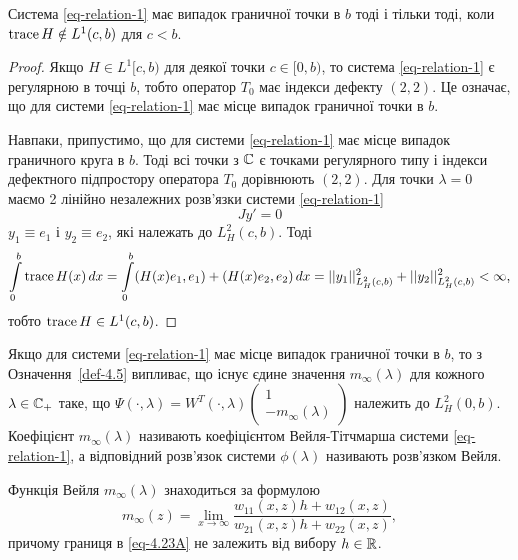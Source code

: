 \begin{theorem}
	Система \eqref{eq-relation-1} має випадок граничної точки в $b$ тоді і тільки тоді, коли $\operatorname{trace} H \notin L^1(c,b)$ для $c<b$.
\end{theorem}
\begin{proof}
	Якщо $H\in L^1[c,b)$ для деякої точки $c\in [0,b)$, то система \eqref{eq-relation-1} є регулярною в точці $b$, тобто оператор $T_0$ має індекси дефекту $(2,2)$. Це означає, що для системи \eqref{eq-relation-1} має місце випадок граничної точки в $b$.

	Навпаки, припустимо, що для системи \eqref{eq-relation-1} має місце випадок граничного круга в $b$. Тоді всі точки з $\mathbb{C}$ є точками регулярного типу і індекси дефектного підпростору оператора $T_0$ дорівнюють $(2,2)$. Для точки $\lambda = 0$ маємо 2 лінійно незалежних розв'язки системи \eqref{eq-relation-1}
	\begin{equation*}
		Jy'=0
	\end{equation*}
	$y_1\equiv e_1$ і $y_2\equiv e_2$, які належать до $L^2_H(c,b)$. Тоді
	\begin{equation*}
		\int\limits_0^b \operatorname{trace} H(x)\,dx = 
		\int\limits_0^b (H(x)e_1,e_1) + (H(x)e_2,e_2)\,dx = 
		||y_1||^2_{L^2_H(c,b)} + ||y_2||^2_{L^2_H(c,b)} < \infty,
	\end{equation*}
	тобто $\operatorname{trace}{H} \in L^1(c,b)$.
\end{proof}

\begin{definition}
	Якщо для системи \eqref{eq-relation-1} має місце випадок граничної точки в $b$, то з Означення~\ref{def-4.5} випливає, що існує єдине значення $m_\infty(\lambda)$ для кожного $\lambda\in\mathbb{C}_+$ таке, що $\Psi(\cdot,\lambda) = W^T(\cdot,\lambda)
\begin{pmatrix}
	1 \\ -m_\infty(\lambda)
\end{pmatrix}
	$ належить до $L^2_H(0,b)$. Коефіцієнт $m_\infty(\lambda)$ називають коефіцієнтом Вейля-Тітчмарша системи \eqref{eq-relation-1}, а відповідний розв'язок системи $\phi(\lambda)$ називають розв'язком Вейля.

	Функція Вейля $m_\infty(\lambda)$ знаходиться за формулою
	\begin{equation}\label{eq-4.23A}
		m_\infty(z) = \lim_{x\to\infty} \frac{w_{11}(x,z)h + w_{12}(x,z)}{w_{21}(x,z)h+w_{22}(x,z)},
	\end{equation}
	причому границя в \eqref{eq-4.23A} не залежить від вибору $h\in\mathbb{R}$.
\end{definition}

